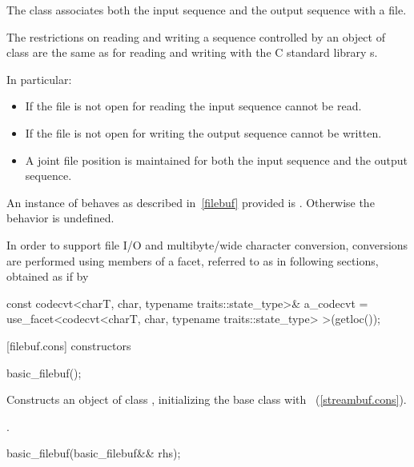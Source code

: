 \pnum
The class
associates both the input sequence and the output
sequence with a file.

\pnum
The restrictions on reading and writing a sequence controlled by an
object of class
are the same as for reading and writing with the C standard library
s.

\pnum
In particular:
\begin{itemize}
\item
If the file is not open for reading the input sequence
cannot be read.
\item
If the file is not open for writing the output
sequence cannot be written.
\item
A joint file position is maintained for both the input sequence and
the output sequence.
\end{itemize}

\pnum
An instance of
behaves as described in~\ref{filebuf} provided
is
.
Otherwise the behavior is undefined.

\pnum
In order to support file I/O and multibyte/wide character conversion,
conversions are performed using members of a facet, referred to as
 in following sections, obtained as if by

\begin{codeblock}
const codecvt<charT, char, typename traits::state_type>& a_codecvt =
  use_facet<codecvt<charT, char, typename traits::state_type> >(getloc());
\end{codeblock}

[filebuf.cons]{ constructors}

%
\begin{itemdecl}
basic_filebuf();
\end{itemdecl}

\begin{itemdescr}
\pnum
\effects
Constructs an object of class
,
initializing the base class with
~(\ref{streambuf.cons}).

\pnum
\postcondition
{}.
\end{itemdescr}

%
\begin{itemdecl}
basic_filebuf(basic_filebuf&& rhs);
\end{itemdecl}

